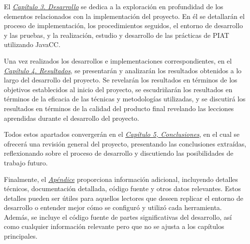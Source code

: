 El \hyperref[sec:cap3]{\textit{Capítulo 3. Desarrollo}} se dedica a la exploración en profundidad de los elementos relacionados con la implementación del proyecto. En él se detallarán el proceso de implementación, los procedimientos seguidos, el entorno de desarrollo y las pruebas, y la realización, estudio y desarrollo de las prácticas de PIAT utilizando JavaCC.

Una vez realizados los desarrollos e implementaciones correspondientes, en el \hyperref[sec:cap4]{\textit{Capítulo 4. Resultados}}, se presentarán y analizarán los resultados obtenidos a lo largo del desarrollo del proyecto. Se revelarán los resultados en términos de los objetivos establecidos al inicio del proyecto, se escudriñarán los resultados en términos de la eficacia de las técnicas y metodologías utilizadas, y se discutirá los resultados en términos de la calidad del producto final revelando las lecciones aprendidas durante el desarrollo del proyecto.

Todos estos apartados convergerán en el \hyperref[sec:cap5]{\textit{Capítulo 5, Conclusiones}}, en el cual se ofrecerá una revisión general del proyecto, presentando las conclusiones extraídas, reflexionando sobre el proceso de desarrollo y discutiendo las posibilidades de trabajo futuro.

Finalmente, el \hyperref[sec:apendice]{\textit{Apéndice}} proporciona información adicional, incluyendo detalles técnicos, documentación detallada, código fuente y otros datos relevantes. Estos detalles pueden ser útiles para aquellos lectores que deseen replicar el entorno de desarrollo o entender mejor cómo se configuró y utilizó cada herramienta. Además, se incluye el código fuente de partes significativas del desarrollo, así como cualquier información  relevante pero que no se ajusta a los capítulos principales.




